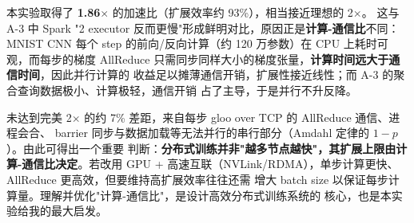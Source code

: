 本实验取得了 \textbf{1.86$\times$} 的加速比（扩展效率约 93\%），相当接近理想的 2$\times$。
这与 A-3 中 Spark "2 executor 反而更慢"形成鲜明对比，原因正是\textbf{计算-通信比}不同：
MNIST CNN 每个 step 的前向/反向计算（约 120 万参数）在 CPU 上耗时可观，而每步的梯度
AllReduce 只需同步同样大小的梯度张量，\textbf{计算时间远大于通信时间}，因此并行计算的
收益足以摊薄通信开销，扩展性接近线性；而 A-3 的聚合查询数据极小、计算极轻，通信开销
占了主导，于是并行不升反降。

未达到完美 2$\times$ 的约 7\% 差距，来自每步 gloo over TCP 的 AllReduce 通信、进程会合、
barrier 同步与数据加载等无法并行的串行部分（Amdahl 定律的 $1-p$）。由此可得出一个重要
判断：\textbf{分布式训练并非"越多节点越快"，其扩展上限由计算-通信比决定}。若改用 GPU +
高速互联（NVLink/RDMA），单步计算更快、AllReduce 更高效，但要维持高扩展效率往往还需
增大 batch size 以保证每步计算量。理解并优化"计算-通信比"，是设计高效分布式训练系统的
核心，也是本实验给我的最大启发。
